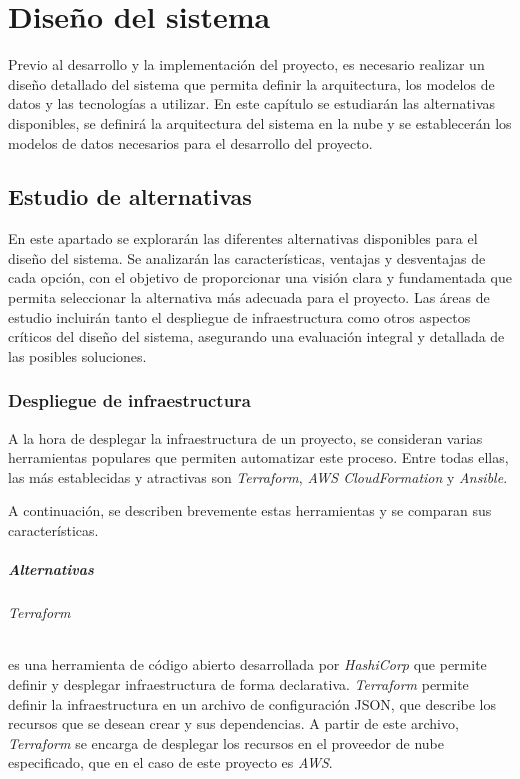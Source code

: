 \chapter{Diseño del sistema}\label{chap:diseño}
Previo al desarrollo y la implementación del proyecto, es necesario realizar un
diseño detallado del sistema que permita definir la arquitectura, los modelos de
datos y las tecnologías a utilizar. En este capítulo se estudiarán las
alternativas disponibles, se definirá la arquitectura del sistema en la nube y
se establecerán los modelos de datos necesarios para el desarrollo del proyecto.


\section{Estudio de alternativas}\label{sec:estudio}
En este apartado se explorarán las diferentes alternativas disponibles para el
diseño del sistema. Se analizarán las características, ventajas y desventajas de
cada opción, con el objetivo de proporcionar una visión clara y fundamentada que
permita seleccionar la alternativa más adecuada para el proyecto. Las áreas de
estudio incluirán tanto el despliegue de infraestructura como otros aspectos
críticos del diseño del sistema, asegurando una evaluación integral y detallada
de las posibles soluciones.


\subsection{Despliegue de infraestructura}\label{subsec:herdesinf}
A la hora de desplegar la infraestructura de un proyecto, se consideran varias
herramientas populares que permiten automatizar este proceso. Entre todas ellas,
las más establecidas y atractivas son \textit{Terraform},
\textit{AWS CloudFormation} y \textit{Ansible}.

A continuación, se describen brevemente estas herramientas y se comparan sus
características.

\paragraph{Alternativas}
\subparagraph{Terraform} es una herramienta de código abierto desarrollada por
\textit{HashiCorp} que permite definir y desplegar infraestructura de forma
declarativa. \textit{Terraform} permite definir la infraestructura en un archivo
de configuración JSON, que describe los recursos que se desean crear y sus
dependencias. A partir de este archivo, \textit{Terraform} se encarga de
desplegar los recursos en el proveedor de nube especificado, que en el caso de
este proyecto es \textit{AWS}.

